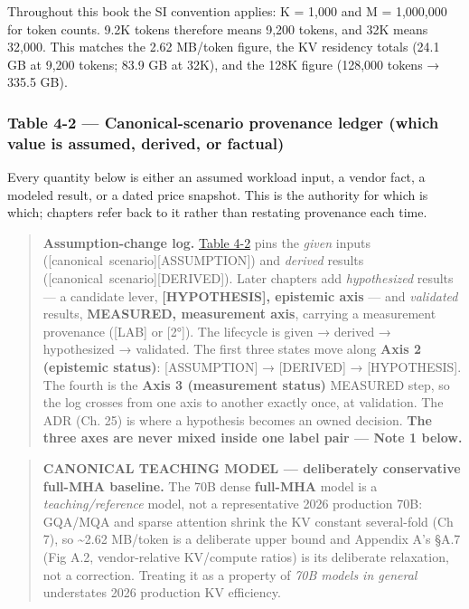 Throughout this book the SI convention applies: K = 1,000 and M =
1,000,000 for token counts. 9.2K tokens therefore means 9,200 tokens,
and 32K means 32,000. This matches the 2.62 MB/token figure, the KV
residency totals (24.1 GB at 9,200 tokens; 83.9 GB at 32K), and the 128K
figure (128,000 tokens → 335.5 GB).

\subsubsection{Table 4-2 --- Canonical-scenario provenance ledger (which
value is assumed, derived, or
factual)}\label{table-4-2-canonical-scenario-provenance-ledger-which-value-is-assumed-derived-or-factual}

Every quantity below is either an assumed workload input, a vendor fact,
a modeled result, or a dated price snapshot. This is the authority for
which is which; chapters refer back to it rather than restating
provenance each time.

\begin{quote}
\textbf{Assumption-change log.} \hyperref[tab:4.2]{Table 4-2} pins the \emph{given} inputs
(\mbox{{[}canonical scenario{]}}\hspace{0pt}\mbox{{[}ASSUMPTION{]}}) and \emph{derived} results
(\mbox{{[}canonical scenario{]}}\hspace{0pt}\mbox{{[}DERIVED{]}}). Later chapters add
\emph{hypothesized} results --- a candidate lever,
\textbf{\mbox{{[}HYPOTHESIS{]}}, epistemic axis} --- and \emph{validated}
results, \textbf{MEASURED, measurement axis}, carrying a measurement
provenance (\mbox{{[}LAB{]}} or \mbox{{[}2°{]}}). The lifecycle is given → derived →
hypothesized → validated. The first three states move along \textbf{Axis
2 (epistemic status)}: \mbox{{[}ASSUMPTION{]}} → \mbox{{[}DERIVED{]}} →
\mbox{{[}HYPOTHESIS{]}}. The fourth is the \textbf{Axis 3 (measurement status)}
MEASURED step, so the log crosses from one axis to another exactly once,
at validation. The ADR (Ch. 25) is where a hypothesis becomes an owned
decision. \textbf{The three axes are never mixed inside one label pair
--- Note 1 below.}
\end{quote}

\begin{quote}
\textbf{CANONICAL TEACHING MODEL --- deliberately conservative full-MHA
baseline.} The 70B dense \textbf{full-MHA} model is a
\emph{teaching/reference} model, not a representative 2026 production
70B: GQA/MQA and sparse attention shrink the KV constant several-fold
(Ch 7), so \textasciitilde2.62 MB/token is a deliberate upper bound and
Appendix A's §A.7 (Fig A.2, vendor-relative KV/compute ratios) is its
deliberate relaxation, not a correction. Treating it as a property of
\emph{70B models in general} understates 2026 production KV efficiency.
\end{quote}

